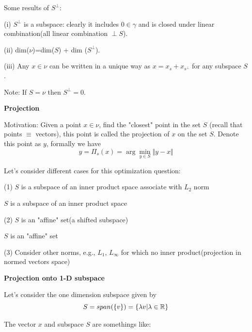 Some results of $S^{\perp}$:

(i) $S^{\perp}$ is a subspace: clearly it includes $0\in\gamma$ and is closed under linear combination(all linear combination $\perp S$).

(ii) dim($\nu$)=dim($S$) + dim ($S^{\perp}$).

(iii) Any $x\in\nu$ can be written in a unique way as $x=x_{s}+x_{s^{\perp}}$ for any subspace $S$.

Note: If $S=\nu$ then $S^{\perp}={0}$.


\vspace{0.5cm}
\noindent\textbf{Projection}

Motivation: Given a point $x\in\nu$, find the "closest" point in the set $S$ (recall that points $\equiv$ vectors), this point is called the projection of $x$ on the set $S$. Denote this point as $y$, formally we have
$$y=\Pi_{s}(x)=\arg \min_{y\in S} \Vert y-x\Vert$$

\vspace{0.3cm}
Let's consider different cases for this optimization question:

(1) $S$ is a subspace of an inner product space associate with $L_{2}$ norm

\begin{marginfigure}
	\centering
	\resizebox{7.5cm}{3cm}{}
	\caption{$S$ is a subspace of an inner product space}
	\label{}
\end{marginfigure}

(2) $S$ is an "affine" set(a shifted subspace)

\begin{marginfigure}
	\centering
	\resizebox{7.5cm}{3cm}{}
	\caption{$S$ is an "affine" set}
	\label{}
\end{marginfigure}

(3) Consider other norms, e.g., $L_{1}$, $L_{\infty}$ for which no inner product(projection in normed vectors space)

\vspace{0.3cm}
\textbf{Projection onto 1-D subspace}

Let's consider the one dimension subspace given by
$$S=span(\{v\})=\{\lambda v|\lambda \in \mathbb{R}\}$$

The vector $x$ and subspace $S$ are somethings like:
\begin{figure}
	\centering
	\resizebox{7.5cm}{3cm}{}
	\caption{}
	\label{}
\end{figure}

